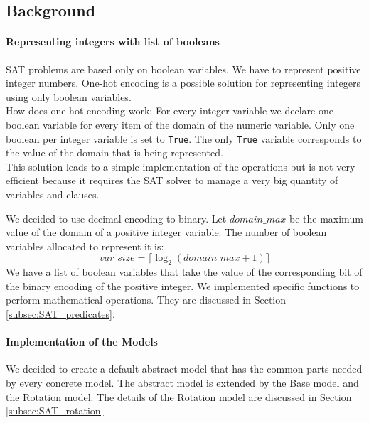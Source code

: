 \subsection{Background}\label{subsec:SAT_background}

  \paragraph*{Representing integers with list of booleans}
    SAT problems are based only on boolean variables. We have to represent positive integer numbers. 
    One-hot encoding is a possible solution for representing integers using only boolean variables.\\
    How does one-hot encoding work:
    For every integer variable we declare one boolean variable for every item of the domain of 
    the numeric variable. Only one boolean per integer variable is set to \texttt{True}. The only \texttt{True} 
    variable corresponds to the value of the domain that is being represented.\\

    This solution leads to a simple implementation of the operations but is not very efficient 
    because it requires the SAT solver to manage a very big quantity of variables and clauses.

    We decided to use decimal encoding to binary. Let \(domain\_max\) be the maximum value of the domain of 
    a positive integer variable. The number of boolean variables allocated to represent it is:
    \begin{equation}
        var\_size = \lceil \log_2 (domain\_max + 1)\rceil
    \end{equation}
    We have a list of boolean variables that take the value of the corresponding bit of the binary encoding
    of the positive integer. We implemented specific functions to perform mathematical operations.
    They are discussed in Section \ref{subsec:SAT_predicates}. \\

  \paragraph*{Implementation of the Models}
    We decided to create a default abstract model that has the common parts needed by
    every concrete model. The abstract model is extended by the Base model and the Rotation model. 
    The details of the Rotation model are discussed in Section \ref{subsec:SAT_rotation}\\

